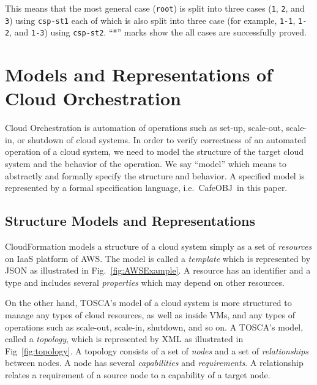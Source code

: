 \documentclass[12pt]{report}
\newcommand{\cafeobj}{{\sf CafeOBJ}~}
\begin{document}
This means that the most general case ({\tt root}) is split into three
cases ({\tt 1}, {\tt 2}, and {\tt 3}) using {\tt csp-st1} each of
which is also split into three case (for example, {\tt 1-1},
{\tt 1-2}, and {\tt 1-3}) using {\tt csp-st2}.  ``*'' marks show the
all cases are successfully proved.

\chapter{Models and Representations of Cloud Orchestration}
\label{chap:model}
Cloud Orchestration is automation of operations such as set-up,
scale-out, scale-in, or shutdown of cloud systems. In order to verify
correctness of an automated operation of a cloud system, we need to
model the structure of the target cloud system and the behavior of the
operation. We say ``model'' which means to abstractly and formally
specify the structure and behavior. A specified model is represented
by a formal specification language, i.e.\ \cafeobj in this paper.

\section{Structure Models and Representations}
\label{sec:structuremodel}
CloudFormation models a structure of a cloud system simply as a set
of {\it resources} on IaaS platform of AWS. The model is called a {\it
  template} which is represented by JSON as illustrated in
Fig.~\ref{fig:AWSExample}.  A resource has an identifier and a type
and includes several {\it properties} which may depend on other
resources.

On the other hand, TOSCA's model of a cloud system is more structured
to manage any types of cloud resources, as well as inside VMs, and any
types of operations such as scale-out, scale-in, shutdown, and so on.
A TOSCA's model, called a {\it topology}, which is represented by XML
as illustrated in Fig~\ref{fig:topology}. A topology consists of a set
of {\it nodes} and a set of {\it relationships} between nodes. A node
has several {\it capabilities} and {\it requirements}. A relationship
relates a requirement of a source node to a capability of a target
node.
\end{document}
